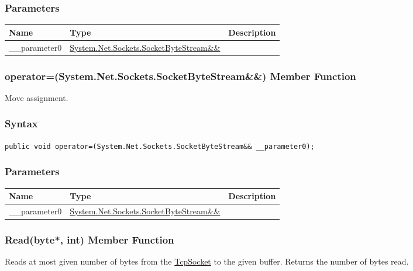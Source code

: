 \documentclass[a4paper,oneside,11.000000pt]{book}
\begin{document}
\subsubsection*{Parameters}
\begin{flushleft}
\begin{supertabular}[l]{!{\raggedright}p{2.61335cm}!{\raggedright}p{7.25332cm}!{\raggedright}p{2.65538cm}}
\textbf{Name}
& \textbf{Type}
& \textbf{Description}
\\
\hline
\_\_parameter0
& \hyperlink{System.Net.Sockets.SocketByteStream}{System.\-Net.\-Sockets.\-SocketByteStream\&\-\&\-}
& 
\\
\end{supertabular}

\end{flushleft}
\clearpage

\hypertarget{System.Net.Sockets.SocketByteStream.operator.assign.P.System.Net.Sockets.SocketByteStream.RR.System.Net.Sockets.SocketByteStream}{\subsubsection*{operator=(System.Net.Sockets.SocketByteStream\&\&) Member Function}}\begin{flushleft}
Move assignment.

\end{flushleft}
\subsubsection*{Syntax}
\texttt{public void operator=(System.Net.Sockets.SocketByteStream\&\& \_\_parameter0);}
\subsubsection*{Parameters}
\begin{flushleft}
\begin{supertabular}[l]{!{\raggedright}p{2.61335cm}!{\raggedright}p{7.25332cm}!{\raggedright}p{2.65538cm}}
\textbf{Name}
& \textbf{Type}
& \textbf{Description}
\\
\hline
\_\_parameter0
& \hyperlink{System.Net.Sockets.SocketByteStream}{System.\-Net.\-Sockets.\-SocketByteStream\&\-\&\-}
& 
\\
\end{supertabular}

\end{flushleft}
\clearpage

\hypertarget{System.Net.Sockets.SocketByteStream.Read.P.System.Net.Sockets.SocketByteStream.P.byte.int}{\subsubsection*{Read(byte*, int) Member Function}}
\begin{flushleft}
Reads at most given number of bytes from the \hyperlink{System.Net.Sockets.TcpSocket}{TcpSocket} to the given buffer.
Returns the number of bytes read.

\end{flushleft}
\end{document}
